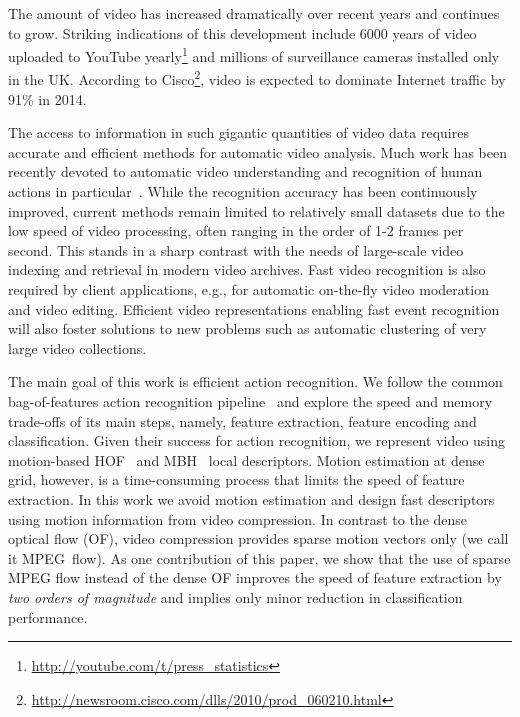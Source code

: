 The amount of video has increased dramatically over recent years and continues to grow. Striking indications of this development
include 6000 years of video uploaded to YouTube
yearly\footnote{\scriptsize
\url{http://youtube.com/t/press\_statistics}} and millions of
surveillance cameras installed only in the UK. According to
Cisco\footnote{\scriptsize
\url{http://newsroom.cisco.com/dlls/2010/prod_060210.html}},
video is expected to dominate Internet traffic by 91\% in 2014.

The access to information in such gigantic quantities of video
data requires accurate and efficient methods for automatic video analysis. Much work has been recently devoted to automatic video understanding and recognition of human actions in
particular~\cite{Laptev08,Liu11,Niebles10,Sadanand12,Schuldt04,Wang12}.
While the recognition accuracy has been continuously improved,
current methods remain limited to relatively small datasets due
to the low speed of video processing, often ranging in the order of 1-2 frames per second. This stands in a sharp contrast with
the needs of large-scale video indexing and retrieval in modern
video archives. Fast video recognition is also required by
client applications, e.g., for automatic on-the-fly video
moderation and video editing. Efficient video representations
enabling fast event recognition will also foster solutions to
new problems such as automatic clustering of very large video
collections.

The main goal of this work is efficient action recognition. We
follow the common bag-of-features action recognition
pipeline~\cite{Laptev08,Schuldt04,Wang12} and explore the speed
and memory trade-offs of its main steps, namely, feature
extraction, feature encoding and classification. Given their
success for action recognition, we represent video
using motion-based HOF~\cite{Laptev08} and MBH~\cite{Wang12}
local descriptors. Motion estimation at dense grid, however, is
a time-consuming process that
limits the speed of feature extraction.
In this work we avoid motion estimation and design
fast
descriptors using motion information from video compression.
In contrast to the dense optical flow (OF), video compression
provides sparse motion vectors only (we call it MPEG~flow).
As one contribution of this paper, we show that the use of
sparse MPEG flow instead of the dense OF improves the speed of
feature extraction by {\em two orders of magnitude} and implies
only minor reduction in classification performance.


